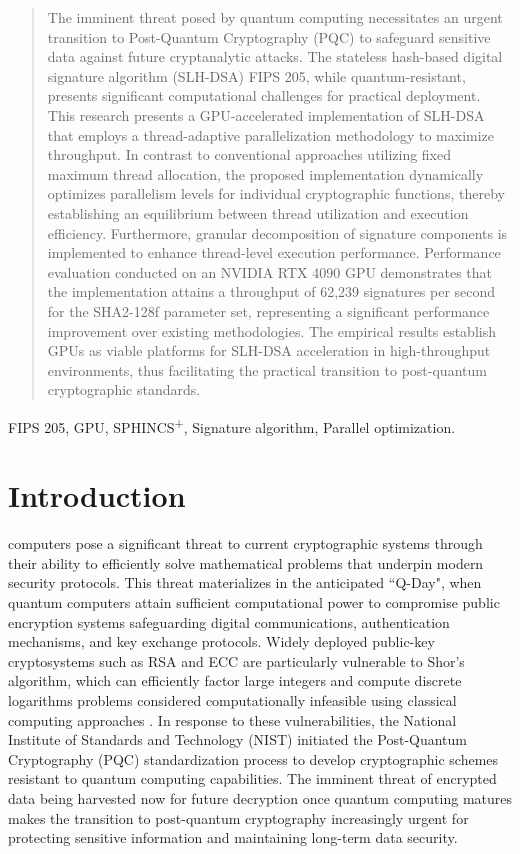 \documentclass[journal]{IEEEtran}
\begin{document}
\begin{abstract}
  The imminent threat posed by quantum computing necessitates an urgent transition to Post-Quantum Cryptography (PQC) to safeguard sensitive data against future cryptanalytic attacks.
  The stateless hash-based digital signature algorithm (SLH-DSA) FIPS 205, while quantum-resistant, presents significant computational challenges for practical deployment.
  This research presents a GPU-accelerated implementation of SLH-DSA that employs a thread-adaptive parallelization methodology to maximize throughput.
  In contrast to conventional approaches utilizing fixed maximum thread allocation, the proposed implementation dynamically optimizes parallelism levels for individual cryptographic  functions, thereby establishing an equilibrium between thread utilization and execution efficiency.
  Furthermore, granular decomposition of signature components is implemented to enhance thread-level execution performance.
  Performance evaluation conducted on an NVIDIA RTX 4090 GPU demonstrates that the implementation attains a throughput of 62,239 signatures per second for the SHA2-128f parameter set, representing a significant performance improvement over existing methodologies.
  The empirical results establish GPUs as viable platforms for SLH-DSA acceleration in high-throughput environments, thus facilitating the practical transition to post-quantum cryptographic standards.

\end{abstract}

\begin{IEEEkeywords}
  FIPS 205, GPU, SPHINCS\textsuperscript{+}, Signature algorithm, Parallel optimization.
\end{IEEEkeywords}

\section{Introduction}
\label{sec:intro}

 computers pose a significant threat to current cryptographic systems through their ability to efficiently solve mathematical problems that underpin modern security protocols. This threat materializes in the anticipated ``Q-Day", when quantum computers attain sufficient computational power to compromise public encryption systems safeguarding digital communications, authentication mechanisms, and key exchange protocols. Widely deployed public-key cryptosystems such as RSA and ECC are particularly vulnerable to Shor's algorithm, which can efficiently factor large integers and compute discrete logarithms problems considered computationally infeasible using classical computing approaches \cite{Yang2023}.
In response to these vulnerabilities, the National Institute of Standards and Technology (NIST) initiated the Post-Quantum Cryptography (PQC) standardization process to develop cryptographic schemes resistant to quantum computing capabilities. The imminent threat of encrypted data being harvested now for future decryption once quantum computing matures makes the transition to post-quantum cryptography increasingly urgent for protecting sensitive information and maintaining long-term data security.
\end{document}
